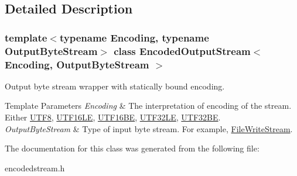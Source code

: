 \subsection{Detailed Description}
\subsubsection*{template$<$typename Encoding, typename Output\+Byte\+Stream$>$\newline
class Encoded\+Output\+Stream$<$ Encoding, Output\+Byte\+Stream $>$}

Output byte stream wrapper with statically bound encoding. 


\begin{DoxyTemplParams}{Template Parameters}
{\em Encoding} & The interpretation of encoding of the stream. Either \hyperlink{a02144}{U\+T\+F8}, \hyperlink{a02152}{U\+T\+F16\+LE}, \hyperlink{a02156}{U\+T\+F16\+BE}, \hyperlink{a02164}{U\+T\+F32\+LE}, \hyperlink{a02168}{U\+T\+F32\+BE}. \\
\hline
{\em Output\+Byte\+Stream} & Type of input byte stream. For example, \hyperlink{a02196}{File\+Write\+Stream}. \\
\hline
\end{DoxyTemplParams}


The documentation for this class was generated from the following file\+:\begin{DoxyCompactItemize}
\item 
encodedstream.\+h\end{DoxyCompactItemize}
